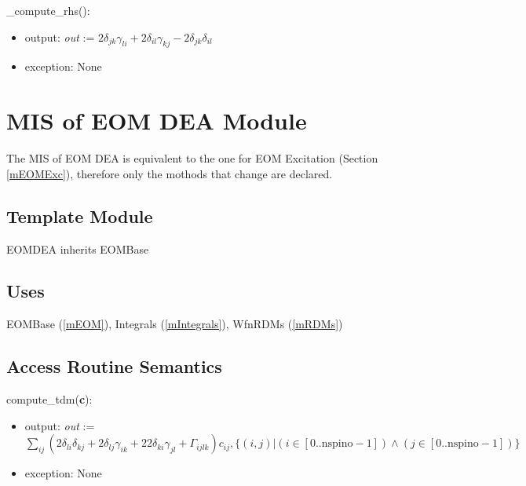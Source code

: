 \documentclass[12pt, titlepage]{article}
\begin{document}
\noindent\_compute\_rhs():
\begin{itemize}
	\item output: \textit{out} := $2\delta_{jk} \gamma_{li} +2\delta_{il} 
	\gamma_{kj}	- 2\delta_{jk} \delta_{il}$
	\item exception: None 
\end{itemize}

\newpage

\section{MIS of EOM DEA Module} \label{mEOMDEA}
The MIS of EOM DEA is equivalent to the one for EOM Excitation (Section 
\ref{mEOMExc}), therefore only the mothods that change are declared.

\subsection{Template Module}

EOMDEA inherits EOMBase

\subsection{Uses}
EOMBase (\ref{mEOM}), Integrals (\ref{mIntegrals}), WfnRDMs (\ref{mRDMs})

\subsection{Access Routine Semantics}
\noindent compute\_tdm(\textbf{c}):
\begin{itemize}
	\item output: \textit{out} := \\
	$\sum_{ij}(2\delta_{li}\delta_{kj} + 2\delta_{lj}\gamma_{ik} + 2 
	2\delta_{ki}\gamma_{jl} + \Gamma_{ijlk})c_{ij}, \{(i,j)|(i\in 
	[0..\text{nspino}-1]) \land (j\in 
	[0..\text{nspino}-1])\}$
	\item exception: None
\end{itemize}
\end{document}
